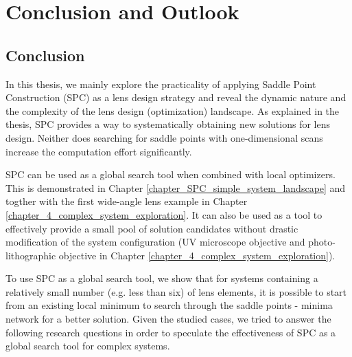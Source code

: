 \chapter{Conclusion and Outlook} %
\label{chapter_Conclusion} %
\graphicspath{ {./chapter-6/figures/} }  %
\captionsetup[figure]{labelfont=bf}
\captionsetup{margin=1.5em}
\captionsetup[table]{labelfont=bf}


\begin{comment}


\epigraph[0pt]{
Nel mezzo del cammin di nostra vita
mi ritrovai per una selva oscura,
che la diritta via era smarrita.

In the midst of life's journey
I found myself in a dark wood
where the right path was lost.

}{First stanza of Dante's Inferno}

\end{comment}
\section{Conclusion}
In this thesis, we mainly explore the practicality of applying  Saddle Point Construction (SPC) as a lens design strategy and reveal the dynamic nature and the complexity of the lens design (optimization) landscape.  As explained in the thesis, SPC provides a way to systematically obtaining new solutions for lens design. Neither does searching for saddle points with one-dimensional scans increase the computation effort significantly. 

SPC can be used as a global search tool when combined with local optimizers. This is demonstrated in Chapter \ref{chapter_SPC_simple_system_landscape} and togther with the first wide-angle lens example in Chapter \ref{chapter_4_complex_system_exploration}. It can also be used as a tool to effectively provide a small pool of solution candidates without drastic modification of the system configuration (UV microscope objective and photo-lithographic objective in Chapter \ref{chapter_4_complex_system_exploration}). 

To use SPC as a global search tool, we show that for systems containing a relatively small number (e.g. less than six) of lens elements, it is possible to start from an existing local minimum to search through the saddle points - minima network for a better solution. Given the studied cases, we tried to answer the following research questions in order to speculate the effectiveness of SPC as a global search tool for complex systems. 

